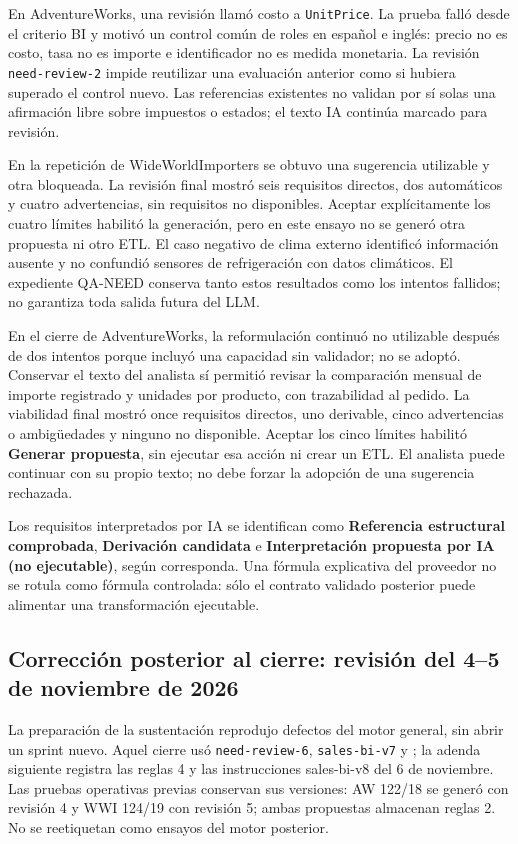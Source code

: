\documentclass[11pt,letterpaper]{article}
\newcommand{\file}[1]{\texttt{#1}}
\begin{document}
En AdventureWorks, una revisión llamó costo a \file{UnitPrice}. La prueba falló desde
el criterio BI y motivó un control común de roles en español e inglés: precio no es
costo, tasa no es importe e identificador no es medida monetaria. La revisión
\file{need-review-2} impide reutilizar una evaluación anterior como si hubiera superado
el control nuevo. Las referencias existentes no validan por sí solas una afirmación
libre sobre impuestos o estados; el texto IA continúa marcado para revisión.

En la repetición de WideWorldImporters se obtuvo una sugerencia utilizable y otra
bloqueada. La revisión final mostró seis requisitos directos, dos automáticos y cuatro
advertencias, sin requisitos no disponibles. Aceptar explícitamente los cuatro límites
habilitó la generación, pero en este ensayo no se generó otra propuesta ni otro ETL.
El caso negativo de clima externo identificó información ausente y no confundió
sensores de refrigeración con datos climáticos. El expediente QA-NEED conserva tanto
estos resultados como los intentos fallidos; no garantiza toda salida futura del LLM.

En el cierre de AdventureWorks, la reformulación continuó no utilizable después de
dos intentos porque incluyó una capacidad sin validador; no se adoptó. Conservar el
texto del analista sí permitió revisar la comparación mensual de importe registrado y
unidades por producto, con trazabilidad al pedido. La viabilidad final mostró once
requisitos directos, uno derivable, cinco advertencias o ambigüedades y ninguno no
disponible. Aceptar los cinco límites habilitó \textbf{Generar propuesta}, sin ejecutar
esa acción ni crear un ETL. El analista puede continuar con su propio texto; no debe
forzar la adopción de una sugerencia rechazada.

Los requisitos interpretados por IA se identifican como \textbf{Referencia estructural
comprobada}, \textbf{Derivación candidata} e \textbf{Interpretación propuesta por IA
(no ejecutable)}, según corresponda. Una fórmula explicativa del proveedor no se
rotula como fórmula controlada: sólo el contrato validado posterior puede alimentar
una transformación ejecutable.

\subsection{Corrección posterior al cierre: revisión del 4--5 de noviembre de 2026}

La preparación de la sustentación reprodujo defectos del motor general, sin abrir
un sprint nuevo. Aquel cierre usó \file{need-review-6}, \file{sales-bi-v7} y
; la adenda siguiente registra las reglas 4 y
las instrucciones sales-bi-v8 del 6 de noviembre. Las pruebas operativas previas conservan sus
versiones: AW 122/18 se generó con revisión 4 y WWI 124/19 con revisión 5; ambas
propuestas almacenan reglas 2. No se reetiquetan como ensayos del motor posterior.
\end{document}
